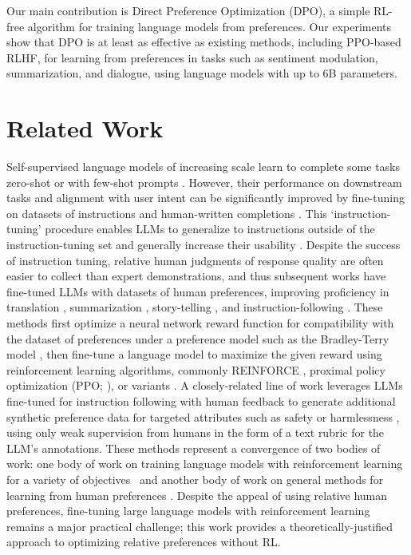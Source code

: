 \documentclass{article}
\begin{document}
Our main contribution is Direct Preference Optimization (DPO), a simple RL-free algorithm for training language models from preferences. Our experiments show that DPO is at least as effective as existing methods, including PPO-based RLHF, for learning from preferences in tasks such as sentiment modulation, summarization, and dialogue, using language models with up to 6B parameters.

\section{Related Work}

Self-supervised language models of increasing scale learn to complete some tasks zero-shot \citep{radford2019language} or with few-shot prompts \citep{gpt3,megatron,chowdhery2022palm}. However, their performance on downstream tasks and alignment with user intent can be significantly improved by fine-tuning on datasets of instructions and human-written completions \citep{mishra-etal-2022-cross,sanh2022multitask,chung2022scaling,thoppilan2022lamda}. This `instruction-tuning' procedure
enables LLMs to generalize to instructions outside of the instruction-tuning set and generally increase their usability \citep{chung2022scaling}. Despite the success of instruction tuning, relative human judgments of response quality are often easier to collect than expert demonstrations, and thus subsequent works have fine-tuned LLMs with datasets of human preferences, improving proficiency in translation \citep{kreutzer-etal-2018-reliability}, summarization \citep{stiennon2022learning,ziegler2020finetuning}, story-telling \citep{ziegler2020finetuning}, and instruction-following \citep{ouyang2022training,ramamurthy2023is}. These methods first optimize a neural network reward function for compatibility with the dataset of preferences under a preference model such as the Bradley-Terry model \citep{bradley1952rankanalysis}, then fine-tune a language model to maximize the given reward using reinforcement learning algorithms, commonly REINFORCE \citep{williams1992reinforce}, proximal policy optimization (PPO; \cite{schulman2017proximal}), or variants \citep{ramamurthy2023is}. A closely-related line of work leverages LLMs fine-tuned for instruction following with human feedback to generate additional synthetic preference data for targeted attributes such as safety or harmlessness \citep{bai2022constitutional}, using only weak supervision from humans in the form of a text rubric for the LLM's annotations. These methods represent a convergence of two bodies of work: one body of work on training language models with reinforcement learning for a variety of objectives~\citep{Ranzato2015SequenceLT,paulus2018a,wu2018learning} and another body of work on general methods for learning from human preferences \citep{christiano2017deep,kupcsik2018learning}.
Despite the appeal of using relative human preferences, fine-tuning large language models with reinforcement learning remains a major practical challenge; this work provides a theoretically-justified approach to optimizing relative preferences without RL.
\end{document}
